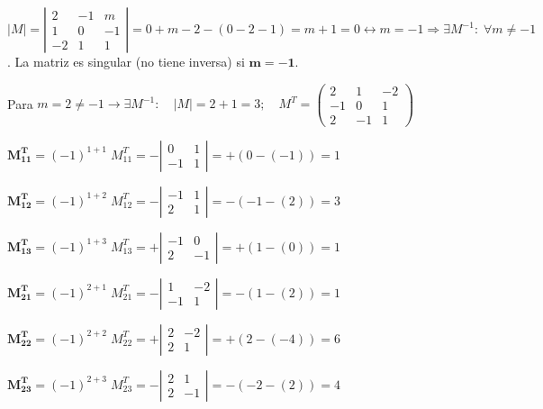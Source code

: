 \begin{proofw}\renewcommand{\qedsymbol}{$\diamond$}

	$|M|=\left| \begin{matrix} 2&-1&m\\1&0&-1\\-2&1&1  \end{matrix} \right| =  0+m-2-(0-2-1)=m+1=0 \leftrightarrow m=-1 \Rightarrow \exists M^{-1} :\; \forall m\neq -1$. La matriz es singular (no tiene inversa) si $\boldsymbol{m=-1}$.
	
\noindent Para $m=2\neq -1 \to  \exists M^{-1}:\quad |M|=2+1=3; \quad 
M^T=\left( \begin{matrix} 2&1&-2\\-1&0&1\\2&-1&1  \end{matrix} \right) $

\noindent $\boldsymbol{M^T_{11}}=(-1)^{1+1}\; M^T_{11}=-\left|\begin{matrix}
  0&1\\-1&1	
 \end{matrix} \right|=+( 0-(-1))= 1$
 
 \noindent $\boldsymbol{M^T_{12}}=(-1)^{1+2}\; M^T_{12}=-\left| \begin{matrix}
 	-1&1\\2&1
 \end{matrix} \right|=-( -1-(2))= 3$
 
  \noindent $\boldsymbol{M^T_{13}}=(-1)^{1+3}\; M^T_{13}=+\left| \begin{matrix}
-1&0\\2&-1 	
 \end{matrix} \right|=+( 1-(0))=1 $
 
  \noindent $\boldsymbol{M^T_{21}}=(-1)^{2+1}\; M^T_{21}=-\left| \begin{matrix}
 1&-2\\-1&1	
 \end{matrix} \right|=-( 1-(2))=1 $
 
  \noindent $\boldsymbol{M^T_{22}}=(-1)^{2+2}\; M^T_{22}=+\left| \begin{matrix}
 2&-2\\2&1	
 \end{matrix} \right|=+( 2-(-4))=6 $
 
  \noindent $\boldsymbol{M^T_{23}}=(-1)^{2+3}\; M^T_{23}=-\left| \begin{matrix}
 2&1\\2&-1	
 \end{matrix} \right|=-( -2-(2))=4 $
 

\end{proofw}
